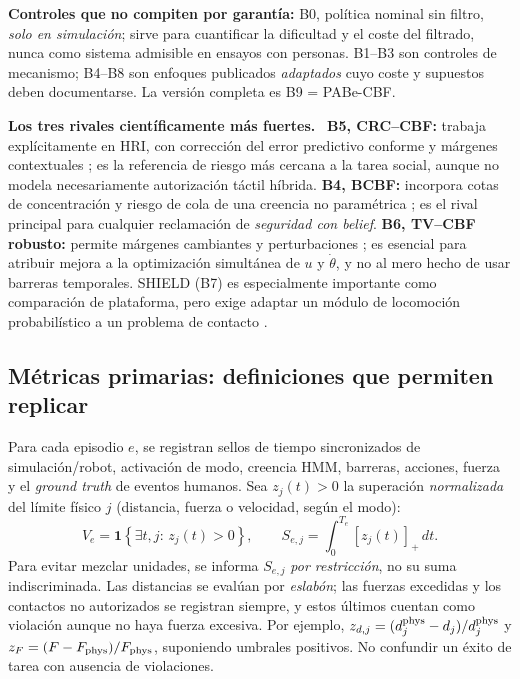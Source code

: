 \documentclass[10pt,a4paper,twocolumn]{article}
\newcommand{\subttl}[1]{\vspace{3pt}\noindent\textbf{\color{ink}#1.}~}
\begin{document}
\textbf{Controles que no compiten por garantía:} B0, política nominal sin filtro, \emph{solo en simulación}; sirve para cuantificar la dificultad y el coste del filtrado, nunca como sistema admisible en ensayos con personas. B1--B3 son controles de mecanismo; B4--B8 son enfoques publicados \emph{adaptados} cuyo coste y supuestos deben documentarse. La versión completa es B9 = PABe-CBF.

\subttl{Los tres rivales científicamente más fuertes}
\textbf{B5, CRC--CBF:} trabaja explícitamente en HRI, con corrección del error predictivo conforme y márgenes contextuales \cite{r5}; es la referencia de riesgo más cercana a la tarea social, aunque no modela necesariamente autorización táctil híbrida. \textbf{B4, BCBF:} incorpora cotas de concentración y riesgo de cola de una creencia no paramétrica \cite{r2}; es el rival principal para cualquier reclamación de \emph{seguridad con belief}. \textbf{B6, TV--CBF robusto:} permite márgenes cambiantes y perturbaciones \cite{r12}; es esencial para atribuir mejora a la optimización simultánea de $u$ y $\dot\theta$, y no al mero hecho de usar barreras temporales. SHIELD (B7) es especialmente importante como comparación de plataforma, pero exige adaptar un módulo de locomoción probabilístico a un problema de contacto \cite{r1}.

\subsection{Métricas primarias: definiciones que permiten replicar}
Para cada episodio $e$, se registran sellos de tiempo sincronizados de simulación/robot, activación de modo, creencia HMM, barreras, acciones, fuerza y el \emph{ground truth} de eventos humanos. Sea $z_j(t)>0$ la superación \emph{normalizada} del límite físico $j$ (distancia, fuerza o velocidad, según el modo):
\begin{equation}
 V_e=\mathbf{1}\!\left\{\exists t,j:\,z_j(t)>0\right\},\qquad
 S_{e,j}=\int_0^{T_e}[z_j(t)]_+\,dt.
 \label{eq:violmetric}
\end{equation}
Para evitar mezclar unidades, se informa $S_{e,j}$ \emph{por restricción}, no su suma indiscriminada. Las distancias se evalúan por \emph{eslabón}; las fuerzas excedidas y los contactos no autorizados se registran siempre, y estos últimos cuentan como violación aunque no haya fuerza excesiva. Por ejemplo, $z_{d,j}=(d_j^{\rm phys}-d_j)/d_j^{\rm phys}$ y $z_F=(F-F_{\rm phys})/F_{\rm phys}$, suponiendo umbrales positivos. No confundir un éxito de tarea con ausencia de violaciones.
\end{document}
